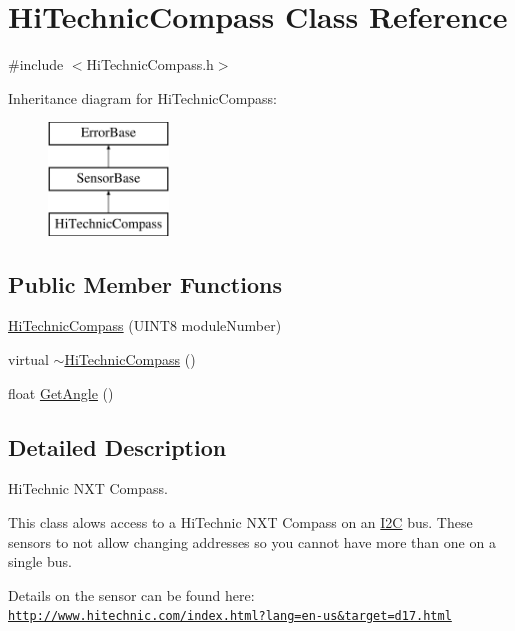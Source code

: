 \hypertarget{classHiTechnicCompass}{
\section{HiTechnicCompass Class Reference}
\label{classHiTechnicCompass}
}


{\ttfamily \#include $<$HiTechnicCompass.h$>$}

Inheritance diagram for HiTechnicCompass:\begin{figure}[H]
\begin{center}
\leavevmode
\includegraphics[height=3.000000cm]{classHiTechnicCompass}
\end{center}
\end{figure}
\subsection*{Public Member Functions}
\begin{DoxyCompactItemize}
\item 
\hyperlink{classHiTechnicCompass_a5bc64b0b66c96f50c1d8a54328e02050}{HiTechnicCompass} (UINT8 moduleNumber)
\item 
virtual \hyperlink{classHiTechnicCompass_a4492a67a04de360c3247f5ec648d4e97}{$\sim$HiTechnicCompass} ()
\item 
float \hyperlink{classHiTechnicCompass_af09859e82140181c2ae4cb2e62f8f991}{GetAngle} ()
\end{DoxyCompactItemize}


\subsection{Detailed Description}
HiTechnic NXT Compass.

This class alows access to a HiTechnic NXT Compass on an \hyperlink{classI2C}{I2C} bus. These sensors to not allow changing addresses so you cannot have more than one on a single bus.

Details on the sensor can be found here: \href{http://www.hitechnic.com/index.html?lang=en-us&target=d17.html}{\tt http://www.hitechnic.com/index.html?lang=en-\/us\&target=d17.html}

